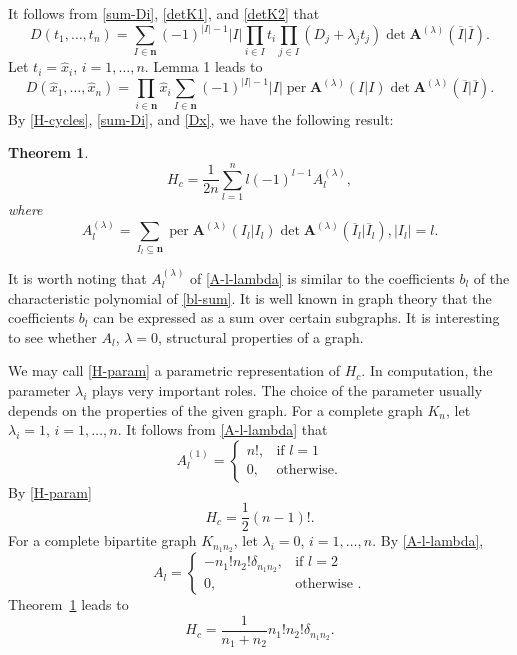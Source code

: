 \documentclass{article}
\newtheorem{thm}{Theorem}[section]
\theoremstyle{definition}
\theoremstyle{remark}
\DeclareMathOperator{\per}{per}
\newcommand{\envert}[1]{\left\lvert#1\right\rvert}
\let\abs=\envert
\begin{document}
It follows from \eqref{sum-Di}, \eqref{detK1}, and \eqref{detK2} that
\begin{equation}\label{Dt}
D(t_1,\dots,t_n)=\sum_{I\in\mathbf{n}}(-1)^{\abs{I}-1}\abs{I}
\prod_{i\in I}t_i\prod_{j\in I}(D_j+\lambda_jt_j)\det\mathbf{A}^{(\lambda)}
(\overline I|\overline I).
\end{equation}
Let $t_i=\hat x_i$, $i=1,\dots,n$. Lemma 1 leads to
\begin{equation}\label{Dx}
D(\hat x_1,\dots,\hat x_n)=\prod_{i\in\mathbf{n}}\hat x_i
\sum_{I\in\mathbf{n}}(-1)^{\abs{I}-1}\abs{I}\per \mathbf{A}
^{(\lambda)}(I|I)\det\mathbf{A}^{(\lambda)}(\overline I|\overline I).
\end{equation}
By \eqref{H-cycles}, \eqref{sum-Di}, and \eqref{Dx},
we have the following result:
\begin{thm}\label{thm-H-param}
\begin{equation}\label{H-param}
H_c=\frac{1}{2n}\sum^n_{l =1}l (-1)^{l -1}A_{l}
^{(\lambda)},
\end{equation}
where
\begin{equation}\label{A-l-lambda}
A^{(\lambda)}_l =\sum_{I_l \subseteq\mathbf{n}}\per \mathbf{A}
^{(\lambda)}(I_l |I_l )\det\mathbf{A}^{(\lambda)}
(\overline I_{l}|\overline I_l ),\abs{I_{l}}=l .
\end{equation}
\end{thm}

It is worth noting that $A_l ^{(\lambda)}$ of \eqref{A-l-lambda} is
similar to the coefficients $b_l $ of the characteristic polynomial of
\eqref{bl-sum}. It is well known in graph theory that the coefficients
$b_l $ can be expressed as a sum over certain subgraphs. It is
interesting to see whether $A_l $, $\lambda=0$, structural properties
of a graph.

We may call \eqref{H-param} a parametric representation of $H_c$. In
computation, the parameter $\lambda_i$ plays very important roles. The
choice of the parameter usually depends on the properties of the given
graph. For a complete graph $K_n$, let $\lambda_i=1$, $i=1,\dots,n$.
It follows from \eqref{A-l-lambda} that
\begin{equation}\label{compl-gr}
A^{(1)}_l =\begin{cases} n!,&\text{if }l =1\\
0,&\text{otherwise}.\end{cases}
\end{equation}
By \eqref{H-param}
\begin{equation}
H_c=\frac 12(n-1)!.
\end{equation}
For a complete bipartite graph $K_{n_1n_2}$, let $\lambda_i=0$, $i=1,\dots,n$.
By \eqref{A-l-lambda},
\begin{equation}
A_l =
\begin{cases} -n_1!n_2!\delta_{n_1n_2},&\text{if }l =2\\
0,&\text{otherwise }.\end{cases}
\label{compl-bip-gr}
\end{equation}
Theorem~\ref{thm-H-param}
leads to
\begin{equation}
H_c=\frac1{n_1+n_2}n_1!n_2!\delta_{n_1n_2}.
\end{equation}
\end{document}
